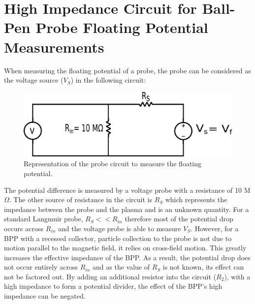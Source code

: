 




\section{High Impedance Circuit for Ball-Pen Probe Floating Potential Measurements} 
When measuring the floating potential of a probe, the probe can be considered as the voltage source ($V_S$) in the following circuit:  

\begin{figure}[H]
\centering
\includegraphics[width=1.0\textwidth]{basic_circuit.pdf}
\caption{Representation of the probe circuit to measure the floating potential.}
\label{fig:emissive}
\end{figure}

The potential difference is measured by a voltage probe with a resistance of 10 M$\Omega$. The other source of resistance in the circuit is $R_S$ which represents the impedance between the probe and the plasma and is an unknown quantity. For a standard Langmuir probe, $R_S << R_{in}$  therefore most of the potential drop occurs across $R_{in}$ and the voltage probe is able to measure $V_S$. However, for a BPP with a recessed collector, particle collection to the probe is not due to motion parallel to the magnetic field, it relies on cross-field motion. This greatly increases the effective impedance of the BPP. As a result, the potential drop does not occur entirely across $R_{in}$ and as the value of $R_S$ is not known, its effect can not be factored out. By adding an additional resistor into the circuit ($R_2$), with a high impedance to form a potential divider, the effect of the BPP's high impedance can be negated.  


